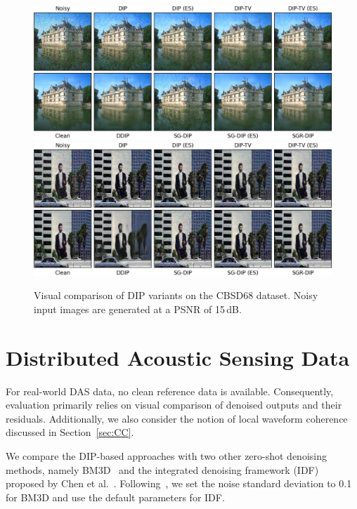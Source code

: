 \begin{figure}
    \centering
    \includegraphics[width=\textwidth]{img/fig_6.2_1.png}\\
    \vspace{20pt}
    \includegraphics[width=\textwidth]{img/fig_6.2_2.png}
    \caption{
        Visual comparison of DIP variants on the CBSD68 dataset.
        Noisy input images are generated at a PSNR of 15\,dB.
    }\label{fig:CBSD68}
\end{figure}

\section{Distributed Acoustic Sensing Data}

For real-world DAS data, no clean reference data is available.
Consequently, evaluation primarily relies on visual comparison of denoised outputs and their residuals.
Additionally, we also consider the notion of local waveform coherence discussed in Section~\ref{sec:CC}.

We compare the DIP-based approaches with two other zero-shot denoising methods, namely BM3D~\cite{BM3D} and the integrated denoising framework (IDF) proposed by Chen et al.~\cite{IDF}.
Following~\cite{SelfMixed}, we set the noise standard deviation to 0.1 for BM3D and use the default parameters for IDF\@.

